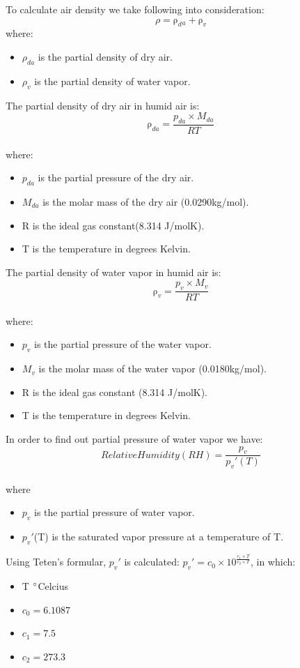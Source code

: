 \documentclass[runningheads]{llncs}
\begin{document}
{\raggedleft To calculate air density we take following into consideration:}\\
\[\rho=\mathrm{\rho}_d{}_a{}+\mathrm{\rho}_v{}\]
\newline
where:
\begin{itemize}
\item $\rho_{da}$ is the partial density of dry air.
\item $\rho_{v}$ is the partial density of water vapor.\\
\end{itemize}
The partial density of dry air in humid air is:\\
\[\mathrm{\rho}_{da}= \frac{p_{da} \times M_{da}}{RT}\]\\
where:
\begin{itemize}
\item $p_{da}$ is the partial pressure of the dry air.
\item $M_{da}$ is the molar mass of the dry air (0.0290kg/mol).
\item R is the ideal gas constant(8.314 J/molK).
\item T is the temperature in degrees Kelvin.
\end{itemize}
The partial density of water vapor in humid air is:\\
\[\mathrm{\rho}_{v}= \frac{p_{v} \times M_{v}}{RT}\]\\
where:
\begin{itemize}
\item $p_v$ is the partial pressure of the water vapor.
\item $M_v$ is the molar mass of the water vapor (0.0180kg/mol).
\item R is the ideal gas constant (8.314 J/molK).
\item T is the temperature in degrees Kelvin.
\end{itemize}
In order to find out partial pressure of water vapor we have:\\
\[Relative Humidity(RH)=\frac{p_{v}}{p_{v}'(T)}\]\\
where
\begin{itemize}
\item $p_{v}$ is the partial pressure of water vapor.
\item $p_{v}'$(T) is the saturated vapor pressure at a temperature of T.
\end{itemize}
Using Teten's formular, $p_{v}'$ is calculated: $p_{v}' = c_{0} \times 10^\frac{c_{1}\times T}{c_{2}\times T} $, in which: 
\begin{itemize}
    \item T $\degree$Celcius
    \item $c_{0} = 6.1087$
    \item $c_{1} = 7.5$
    \item $c_{2} = 273.3$
\end{itemize}
\end{document}
